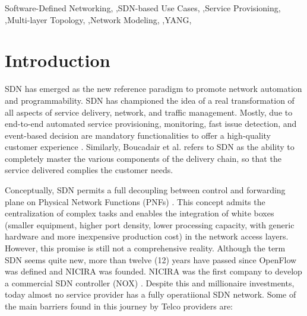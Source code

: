 \documentclass[a4paper,fleqn]{cas-dc}
\begin{document}


\begin{keywords}
Software-Defined Networking,
\sep SDN-based Use Cases, 
\sep Service Provisioning,
\sep Multi-layer Topology,
\sep Network Modeling, 
\sep YANG,  
\end{keywords}

\maketitle

\section{Introduction}
SDN has emerged as the new reference paradigm to promote network automation and programmability. SDN has championed the idea of a real transformation of all aspects of service delivery, network, and traffic management. Mostly, due to end-to-end automated service provisioning, monitoring, fast issue detection, and event-based decision are mandatory functionalities to offer a high-quality customer experience \cite{ordonez2017network,ong2017onf}. Similarly, Boucadair et al. \cite{boucadair2014software} refers to SDN as the ability to completely master the various components of the delivery chain, so that the service delivered complies the customer needs.

Conceptually, SDN permits a full decoupling between control and forwarding plane on Physical Network Functions (PNFs) \cite{brief2014openflow}. This concept admits the centralization of complex tasks and enables the integration of white boxes (smaller equipment, higher port density, lower processing capacity, with generic hardware and more inexpensive production cost) in the network access layers. However, this promise is still not a comprehensive reality. Although the term SDN seems quite new, more than twelve (12) years have passed since OpenFlow \cite{brief2014openflow} was defined and NICIRA was founded. NICIRA was the first company to develop a commercial SDN controller (NOX) \cite{gude2008nox,tavakoli2009applying}. Despite this and millionaire investments, today almost no service provider has a fully operatiional SDN network. Some of the main barriers found in this journey by Telco providers are:
\end{document}
